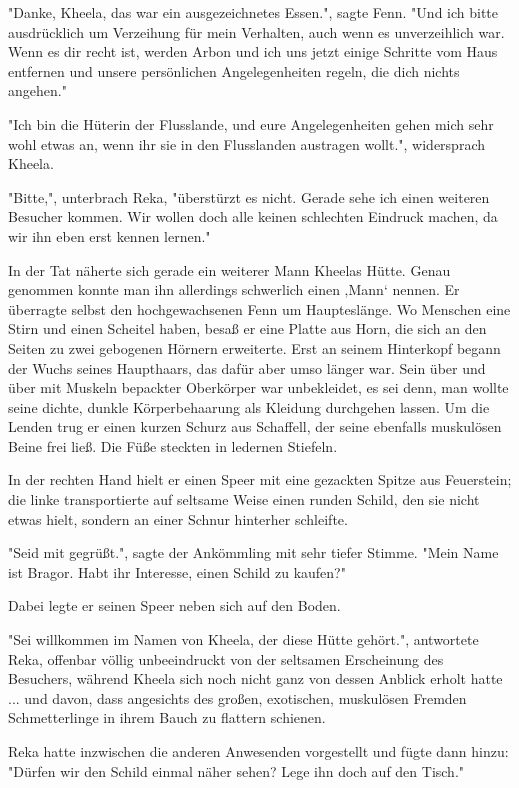 \documentclass[10pt, a4paper, oneside]{book}
\begin{document}
\begin{multicols}{2}
"Danke, Kheela, das war ein ausgezeichnetes Essen.", sagte Fenn. "Und ich bitte ausdrücklich um Verzeihung für mein Verhalten, auch wenn es unverzeihlich war. Wenn es dir recht ist, werden Arbon und ich uns jetzt einige Schritte vom Haus entfernen und unsere persönlichen Angelegenheiten regeln, die dich nichts angehen." 

"Ich bin die Hüterin der Flusslande, und eure Angelegenheiten gehen mich sehr wohl etwas an, wenn ihr sie in den Flusslanden austragen wollt.", widersprach Kheela. 

"Bitte,", unterbrach Reka, "überstürzt es nicht. Gerade sehe ich einen weiteren Besucher kommen. Wir wollen doch alle keinen schlechten Eindruck machen, da wir ihn eben erst kennen lernen." 

In der Tat näherte sich gerade ein weiterer Mann Kheelas Hütte. Genau genommen konnte man ihn allerdings schwerlich einen ‚Mann‘ nennen. Er überragte selbst den hochgewachsenen Fenn um Haupteslänge. Wo Menschen eine Stirn und einen Scheitel haben, besaß er eine Platte aus Horn, die sich an den Seiten zu zwei gebogenen Hörnern erweiterte. Erst an seinem Hinterkopf begann der Wuchs seines Haupthaars, das dafür aber umso länger war. Sein über und über mit Muskeln bepackter Oberkörper war unbekleidet, es sei denn, man wollte seine dichte, dunkle Körperbehaarung als Kleidung durchgehen lassen. Um die Lenden trug er einen kurzen Schurz aus Schaffell, der seine ebenfalls muskulösen Beine frei ließ. Die Füße steckten in ledernen Stiefeln. 

In der rechten Hand hielt er einen Speer mit eine gezackten Spitze aus Feuerstein; die linke transportierte auf seltsame Weise einen runden Schild, den sie nicht etwas hielt, sondern an einer Schnur hinterher schleifte. 

"Seid mit gegrüßt.", sagte der Ankömmling mit sehr tiefer Stimme. "Mein Name ist Bragor. Habt ihr Interesse, einen Schild zu kaufen?" 

Dabei legte er seinen Speer neben sich auf den Boden. 

"Sei willkommen im Namen von Kheela, der diese Hütte gehört.", antwortete Reka, offenbar völlig unbeeindruckt von der seltsamen Erscheinung des Besuchers, während Kheela sich noch nicht ganz von dessen Anblick erholt hatte ... und davon, dass angesichts des großen, exotischen, muskulösen Fremden Schmetterlinge in ihrem Bauch zu flattern schienen. 

Reka hatte inzwischen die anderen Anwesenden vorgestellt und fügte dann hinzu: "Dürfen wir den Schild einmal näher sehen? Lege ihn doch auf den Tisch." 


\end{multicols}
\end{document}
